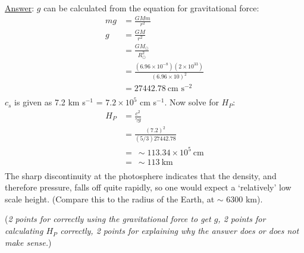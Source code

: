 \documentclass[12pt]{article}
\begin{document}
\begin{enumerate}
\begin{enumerate}
        {\small\underline{Answer}: 
            $g$ can be calculated from the equation for gravitational
            force:
            \begin{align*}
                mg &= \frac{GMm}{r^{2}}\\
                 g &= \frac{GM}{r^{2}}\\
                   &= \frac{GM_{\odot}}{R_{\odot}^{2}}\\
                   &= \frac{(6.96\times10^{-8})(2\times10^{33})}
                       {{(6.96\times10)}^{2}}\\
                   &= 27442.78\ \textrm{cm\ s}^{-2}\\
            \end{align*}
            $c_{s}$ is given as 7.2 km s$^{-1}$ = $7.2\times10^{5}$ cm s$^{-1}$.
            Now solve for $H_{P}$:
            \begin{align*}
                H_{P} &= \frac{c^{2}}{\gamma{g}}\\
                    &= \frac{(7.2)^2}{(5/3)27442.78}\\
                   &=\ \sim 113.34\times10^{5}\ \textrm{cm}\\ 
                   &=\ \sim 113\ \textrm{km}\\
            \end{align*}
            The sharp discontinuity at the photosphere indicates that the
            density, and therefore pressure, falls off quite rapidly, so
            one would expect a `relatively' low scale height.
            (Compare this to the radius of the Earth, at $\sim$ 6300 km).

        (\emph{2 points for correctly using the gravitational force to
        get $g$, 2 points for calculating $H_{P}$ correctly,
        2 points for explaining
        why the answer does or does not make sense.})}

\end{enumerate}
\end{enumerate}

\end{document}
